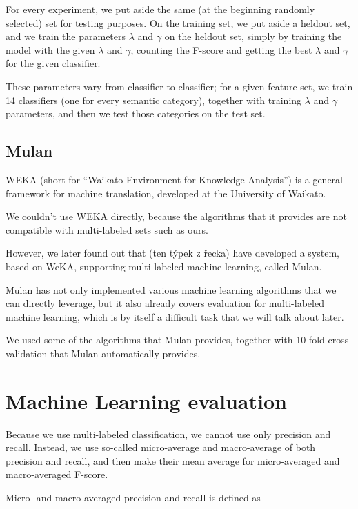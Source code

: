 \documentclass[letterpaper]{article}
\begin{document}
For every experiment, we put aside the same (at the beginning randomly selected) set for testing purposes. 
On the training set, we put aside a heldout set, and we train the parameters $\lambda$ and $\gamma$ on the heldout set, simply by training the model with the given $\lambda$ and $\gamma$, counting the F-score and getting the best $\lambda$ and $\gamma$ for the given classifier.

These parameters vary from classifier to classifier; for a given feature set, we train 14 classifiers (one for every semantic category), together with training $\lambda$ and $\gamma$ parameters, and then we test those categories on the test set.

\subsection{Mulan}
WEKA (short for ``Waikato Environment for Knowledge Analysis'') is a general framework for machine translation, developed at the University of Waikato.

We couldn't use WEKA directly, because the algorithms that it provides are not compatible with multi-labeled sets such as ours. 

However, we later found out  that (ten týpek z řecka) have developed a system, 
based on WeKA, supporting multi-labeled machine learning, called Mulan.

Mulan has not only implemented various machine learning algorithms that we can directly leverage, but it also already 
covers evaluation for multi-labeled machine learning, which is by itself a difficult task that we will talk about later.

We used some of the algorithms that Mulan provides, together with 10-fold cross-validation that Mulan automatically provides.

\section{Machine Learning evaluation}
Because we use multi-labeled classification, we cannot use only precision and recall. Instead, we use so-called micro-average and macro-average of both precision and recall, and then make their mean average for micro-averaged and macro-averaged F-score.

Micro- and macro-averaged precision and recall is defined as  
\end{document}

